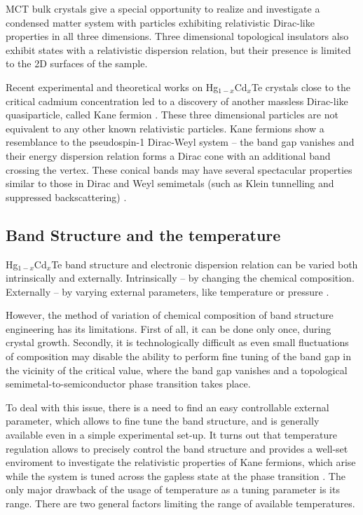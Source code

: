 \documentclass[titlepage,a4paper]{book}
\newcommand{\wciecie}{\quad\phantom{v}}
\begin{document}
MCT bulk crystals give a special opportunity to realize and investigate a condensed matter system with particles exhibiting relativistic Dirac-like properties in all three dimensions. Three dimensional topological insulators also exhibit states with a relativistic dispersion relation, but their presence is limited to the 2D surfaces of the sample.

Recent experimental \cite{Orlita_MCT} and theoretical \cite{Malcolm_MCT} works on Hg$_{1-x}$Cd$_x$Te crystals close to the critical cadmium concentration led to a discovery of another massless Dirac-like quasiparticle, called Kane fermion \cite{Orlita_MCT}. These three dimensional particles are not equivalent to any other known relativistic particles. Kane fermions show a resemblance to the pseudospin-1 Dirac-Weyl system \cite{Malcolm_MCT} -- the band gap vanishes \cite{Weiler_MCT} and their energy dispersion relation forms a Dirac cone with an additional band crossing the vertex. These conical bands may have several spectacular properties similar to those in Dirac and Weyl semimetals (such as Klein tunnelling and suppressed backscattering) \cite{Orlita_MCT}. 

\subsection{Band Structure and the temperature}
\wciecie
Hg$_{1-x}$Cd$_x$Te band structure and electronic dispersion relation can be varied both intrinsically and externally. Intrinsically -- by changing the chemical composition. Externally -- by varying external parameters, like temperature \cite{Capper_MCT} or pressure \cite{Krishtopenko_pressure}. 

However, the method of variation of chemical composition of band structure engineering has its limitations. First of all, it can be done only once, during crystal growth. Secondly, it is technologically difficult as even small fluctuations of composition may disable the ability to perform fine tuning of the band gap in the vicinity of the critical value, where the band gap vanishes and a topological semimetal-to-semiconductor phase transition takes place.

To deal with this issue, there is a need to find an easy controllable external parameter, which allows to fine tune the band structure, and is generally available even in a simple experimental set-up. It turns out that temperature regulation allows to precisely control the band structure and provides a well-set enviroment to investigate the relativistic properties of Kane fermions, which arise while the system is tuned across the gapless state at the phase transition \cite{Teppe_MCT}. The only major drawback of the usage of temperature as a tuning parameter is its range. There are two general factors limiting the range of available temperatures. 
\end{document}
